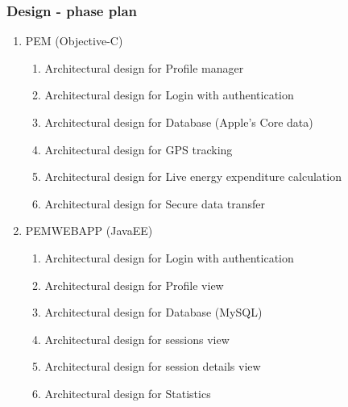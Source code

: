 \documentclass[12pt, a4paper]{report}   %
\begin{document}
\subsubsection{Design - phase plan}
\begin{enumerate}
	\item PEM (Objective-C)
		\begin{enumerate}
			\item Architectural design for Profile manager
			\item Architectural design for Login with authentication
			\item Architectural design for Database (Apple's Core data)
			\item Architectural design for GPS tracking
			\item Architectural design for Live energy expenditure calculation
			\item Architectural design for Secure data transfer
		\end{enumerate}
	\item PEMWEBAPP (JavaEE)
		\begin{enumerate}
			\item Architectural design for Login with authentication
			\item Architectural design for Profile view
			\item Architectural design for Database (MySQL)
			\item Architectural design for sessions view
			\item Architectural design for session details view
			\item Architectural design for Statistics

		\end{enumerate}

\end{enumerate}


\end{document}
